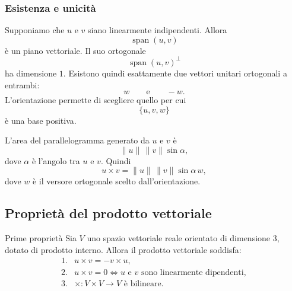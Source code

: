 \documentclass[a4paper]{article}
\begin{document}
\subsubsection{Esistenza e unicità}

Supponiamo che \(u\) e \(v\) siano linearmente indipendenti. Allora
\[
    \operatorname{span}(u,v)
\]
è un piano vettoriale. Il suo ortogonale
\[
    \operatorname{span}(u,v)^\perp
\]
ha dimensione \(1\). Esistono quindi esattamente due vettori unitari ortogonali a entrambi:
\[
    w
    \qquad
    \text{e}
    \qquad
    -w.
\]
L'orientazione permette di scegliere quello per cui
\[
    \{u,v,w\}
\]
è una base positiva.

L'area del parallelogramma generato da \(u\) e \(v\) è
\[
    \|u\|\,\|v\|\sin\alpha,
\]
dove \(\alpha\) è l'angolo tra \(u\) e \(v\). Quindi
\[
    u\times v
    =
    \|u\|\,\|v\|\sin\alpha\, w,
\]
dove \(w\) è il versore ortogonale scelto dall'orientazione.

\begin{center}
\end{center}

\subsection{Proprietà del prodotto vettoriale}

\begin{snippetproposition}{Prime proprietà}
    Sia \(V\) uno spazio vettoriale reale orientato di dimensione \(3\), dotato di prodotto interno. Allora il prodotto vettoriale soddisfa:
    \[
        \begin{array}{ll}
            \text{1.} & u\times v=-v\times u,\\[1mm]
            \text{2.} & u\times v=0
            \Longleftrightarrow
            u\text{ e }v\text{ sono linearmente dipendenti},\\[1mm]
            \text{3.} & \times:V\times V\to V
            \text{ è bilineare}.
        \end{array}
    \]
\end{snippetproposition}
\end{document}
